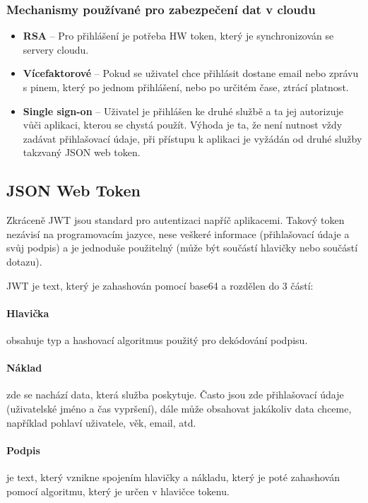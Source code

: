 \subsubsection{Mechanismy používané pro zabezpečení dat v cloudu}
\begin{itemize}
  \item \textbf{RSA} -- Pro přihlášení je potřeba HW token, který je synchronizován se servery cloudu.
  \item \textbf{Vícefaktorové} -- Pokud se uživatel chce přihlásit dostane email nebo zprávu s pinem, který po jednom přihlášení, nebo po určitém čase, ztrácí platnost.
  \item \textbf{Single sign-on} -- Uživatel je přihlášen ke druhé službě a ta jej autorizuje vůči aplikaci, kterou se chystá použít. Výhoda je ta, že není nutnost vždy zadávat přihlašovací údaje, při přístupu k aplikaci je vyžádán od druhé služby takzvaný JSON web token. \cite{cloud-security}
\end{itemize}

\subsection{JSON Web Token}
\par Zkráceně JWT jsou standard pro autentizaci napříč aplikacemi. Takový token nezávisí na programovacím jazyce, nese veškeré informace (přihlašovací údaje a svůj podpis) a je jednoduše použitelný (může být součástí hlavičky nebo součástí dotazu).  \cite{scotch-jwt}

\par JWT je text, který je zahashován pomocí base64 a rozdělen do 3 částí:

\paragraph{Hlavička} obsahuje typ a hashovací algoritmus použitý pro dekódování podpisu.

\paragraph{Náklad} zde se nachází data, která služba poskytuje. Často jsou zde přihlašovací údaje (uživatelské jméno a čas vypršení), dále může obsahovat jakákoliv data chceme, například pohlaví uživatele, věk, email, atd.

\paragraph{Podpis} je text, který vznikne spojením hlavičky a nákladu, který je poté zahashován pomocí algoritmu, který je určen v hlavičce tokenu. \cite{rfc-jwt}
